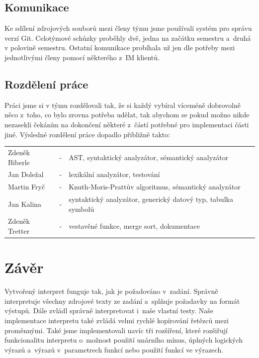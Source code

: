 \documentclass[12pt,a4paper,titlepage,final]{article}
\begin{document}
\subsection{Komunikace}
Ke sdílení zdrojových souborů mezi členy týmu jsme používali systém pro 
správu verzí Git. Celotýmové schůzky proběhly dvě, jedna na začátku semestru 
a~druhá v polovině semestru. Ostatní komunikace probíhala už jen dle potřeby mezi 
jednotlivými členy pomocí některého z~IM klientů.
\subsection{Rozdělení práce}
Práci jsme si v týmu rozdělovali tak, že si každý vybíral víceméně dobrovolně 
něco z~toho, co bylo zrovna potřeba udělat, tak abychom se pokud možno nikde 
nezasekli čekáním na dokončení některé z~částí potřebné pro implementaci části jiné.
\newline\newline
Výsledné rozdělení práce dopadlo přibližně takto: \medskip

\begin{tabular}{llp{12.4cm}}
Zdeněk Biberle & - & AST, syntaktický analyzátor, sémantický analyzátor\\
Jan Doležal    & - & lexikální analyzátor, testování\\
Martin Fryč    & - & Knuth-Moris-Prattův algoritmus, sémantický analyzátor\\
Jan Kalina     & - & syntaktický analyzátor, generický datový typ, tabulka symbolů\\
Zdeněk Tretter & - & vestavěné funkce, merge sort, dokumentace\\
\end{tabular}

\section{Závěr} \label{zaver}
Vytvořený interpret funguje tak, jak je požadováno v~zadání. Správně interpretuje 
všechny zdrojové texty ze zadání a~splňuje požadavky na formát výstupů. Dále zvládl 
správně interpretovat i~naše vlastní testy. Naše implementace interpretu také zvládá 
velmi rychlé kopírování řetězců mezi proměnnými. Také jsme implementovali navíc tři 
rozšíření, které rozšiřují funkcionalitu interpretu o~možnost použití unárního mínus, 
úplných logických výrazů a~výrazů v~parametrech funkcí nebo použití funkcí ve výrazech.
\end{document}
